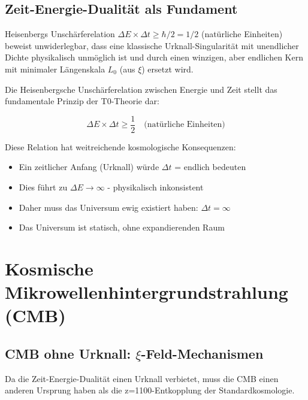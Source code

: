 	\subsection{Zeit-Energie-Dualität als Fundament}
	
	\begin{revolutionary}
		Heisenbergs Unschärferelation $\Delta E \times \Delta t \geq \hbar/2 = 1/2$ (natürliche Einheiten) beweist unwiderlegbar, dass eine klassische Urknall-Singularität mit unendlicher Dichte physikalisch unmöglich ist und durch einen winzigen, aber endlichen Kern mit minimaler Längenskala $L_0$ (aus $\xi$) ersetzt wird.
	\end{revolutionary}
	
	Die Heisenbergsche Unschärferelation zwischen Energie und Zeit stellt das fundamentale Prinzip der T0-Theorie dar:
	
	\begin{equation}
		\Delta E \times \Delta t \geq \frac{1}{2} \quad \text{(natürliche Einheiten)}
	\end{equation}
	
	Diese Relation hat weitreichende kosmologische Konsequenzen:
	\begin{itemize}
		\item Ein zeitlicher Anfang (Urknall) würde $\Delta t$ = endlich bedeuten
		\item Dies führt zu $\Delta E \to \infty$ - physikalisch inkonsistent
		\item Daher muss das Universum ewig existiert haben: $\Delta t = \infty$
		\item Das Universum ist statisch, ohne expandierenden Raum
	\end{itemize}

	\section{Kosmische Mikrowellenhintergrundstrahlung (CMB)}
	
	\subsection{CMB ohne Urknall: $\xi$-Feld-Mechanismen}
	
	\begin{revolutionary}
		Da die Zeit-Energie-Dualität einen Urknall verbietet, muss die CMB einen anderen Ursprung haben als die z=1100-Entkopplung der Standardkosmologie.
	\end{revolutionary}
	

